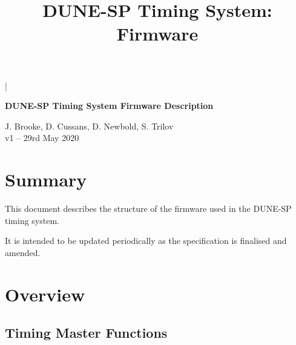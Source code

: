 \documentclass[a4paper,11pt]{article}
\begin{document}

\lstMakeShortInline[columns=fixed]|

\title{DUNE-SP Timing System: Firmware}
\begin{center}
{\LARGE\bf DUNE-SP Timing System Firmware Description}
\vspace{1cm}

J. Brooke, D. Cussans, D. Newbold, S. Trilov \\
\vspace*{1ex}
v1 -- 29rd May 2020
\end{center}
\vspace*{\fill}
\setcounter{tocdepth}{1}
\tableofcontents
\vspace*{\fill}

\section*{Summary}

This document describes the structure of the firmware used in the DUNE-SP timing system. 

It is intended to be updated periodically as the specification is finalised and amended.

\newpage
\section{Overview}


\subsection{Timing Master Functions}


\clearpage
\printbibliography
\end{document}
